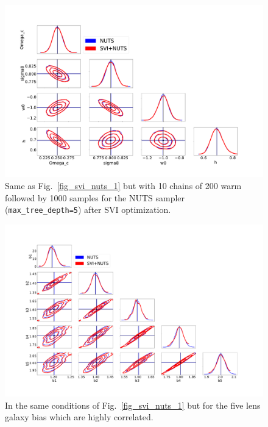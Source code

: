 \documentclass[final,5p,times,twocolumn,authoryear]{elsarticle}
\begin{document}
\begin{figure}
\includegraphics[width=\columnwidth]{figures/SVI_NUTS_10x200x1000.pdf}
\caption{Same as Fig.~\ref{fig_svi_nuts_1} but with 10 chains of 200 warm followed by 1000 samples for the NUTS sampler (\texttt{max\_tree\_depth=5}) after SVI optimization.}
\label{fig_svi_nuts_3}
\end{figure}

\begin{figure}
\includegraphics[width=\columnwidth]{figures/SVI_NUTS_1x200x200_bis.pdf}
\caption{In the same conditions of Fig.~\ref{fig_svi_nuts_1} but for the five lens galaxy bias which are highly correlated.}
\label{fig_svi_nuts_4}
\end{figure}
\end{document}
